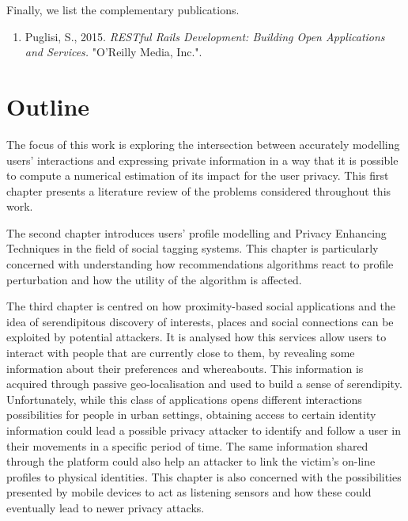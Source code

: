 Finally, we list the complementary publications.

\begin{enumerate}
    \item Puglisi, S., 2015. \emph{RESTful Rails Development: Building Open Applications and Services.} "O'Reilly Media, Inc.".
\end{enumerate}

\section{Outline}

The focus of this work is exploring the intersection between accurately modelling users' interactions and expressing private information in a way that it is possible to compute a numerical estimation of its impact for the user privacy. This first chapter presents a literature review of the problems considered throughout this work.

The second chapter introduces users' profile modelling and Privacy Enhancing Techniques in the field of social tagging systems. This chapter is particularly concerned with understanding how recommendations algorithms react to profile perturbation and how the utility of the algorithm is affected.

The third chapter is centred on how proximity-based social applications and the idea of serendipitous discovery of interests, places and social connections can be exploited by potential attackers. It is analysed how this services allow users to interact with people that are currently close to them, by revealing some information about their preferences and whereabouts. This information is acquired through passive geo-localisation and used to build a sense of serendipity. Unfortunately, while this class of applications opens different interactions possibilities for people in urban settings, obtaining access to certain identity information could lead a possible privacy attacker to identify and follow a user in their movements in a specific period of time. The same information shared through the platform could also help an attacker to link the victim’s on-line profiles to physical identities. This chapter is also concerned with the possibilities presented by mobile devices to act as listening sensors and how these could eventually lead to newer privacy attacks.

